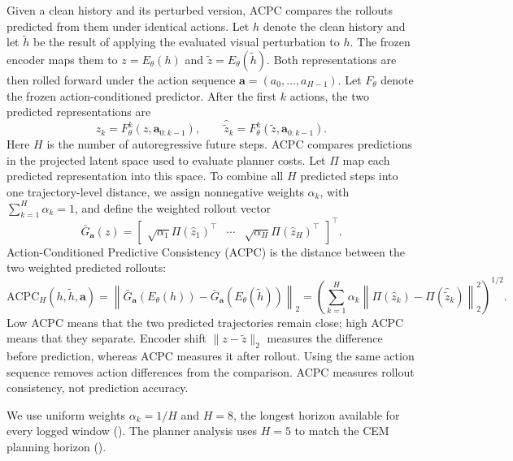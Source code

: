 \documentclass[10pt]{article}
\begin{document}
Given a clean history and its perturbed version, ACPC compares the rollouts
predicted from them under identical actions. Let $h$ denote the clean history
and let $\tilde h$ be the result of applying the evaluated visual perturbation
to $h$. The frozen encoder maps them to $z=E_\theta(h)$ and
$\tilde z=E_\theta(\tilde h)$. Both representations are then rolled forward
under the action sequence $\mathbf a=(a_0,\ldots,a_{H-1})$. Let $F_\theta$
denote the frozen action-conditioned predictor. After the first $k$ actions,
the two predicted representations are
\begin{equation}
\hat z_k=F_\theta^k(z,\mathbf a_{0:k-1}),
\qquad
\hat{\tilde z}_k=F_\theta^k(\tilde z,\mathbf a_{0:k-1}).
\label{eq:acpc-rollout-objects}
\end{equation}
Here $H$ is the number of autoregressive future steps. ACPC compares
predictions in the projected latent space used to evaluate planner costs. Let
$\Pi$ map each predicted representation into this space. To combine all $H$
predicted steps into one trajectory-level distance, we assign nonnegative
weights $\alpha_k$, with $\sum_{k=1}^H\alpha_k=1$, and define the weighted
rollout vector
\begin{equation}
\bar G_{\mathbf a}(z)
=
\begin{bmatrix}
\sqrt{\alpha_1}\Pi(\hat z_1)^\top & \cdots &
\sqrt{\alpha_H}\Pi(\hat z_H)^\top
\end{bmatrix}^{\!\top}.
\label{eq:weighted-rollout-map}
\end{equation}
Action-Conditioned Predictive Consistency (ACPC) is the distance between the
two weighted predicted rollouts:
\begin{equation}
\mathrm{ACPC}_H(h,\tilde h,\mathbf a)
=
\left\|\bar G_{\mathbf a}(E_\theta(h))
-\bar G_{\mathbf a}(E_\theta(\tilde h))\right\|_2
=
\left(
\sum_{k=1}^H\alpha_k
\left\|\Pi(\hat z_k)-\Pi(\hat{\tilde z}_k)\right\|_2^2
\right)^{1/2}.
\label{eq:acpc-h}
\end{equation}
Low ACPC means that the two predicted trajectories remain close; high ACPC
means that they separate. Encoder shift $\|z-\tilde z\|_2$ measures the
difference before prediction, whereas ACPC measures it after rollout. Using
the same action sequence removes action differences from the comparison.
ACPC measures rollout consistency, not prediction accuracy.

We use uniform weights $\alpha_k=1/H$ and $H=8$, the longest horizon available
for every logged window (). The planner analysis uses
$H=5$ to match the CEM planning horizon ().
\end{document}
